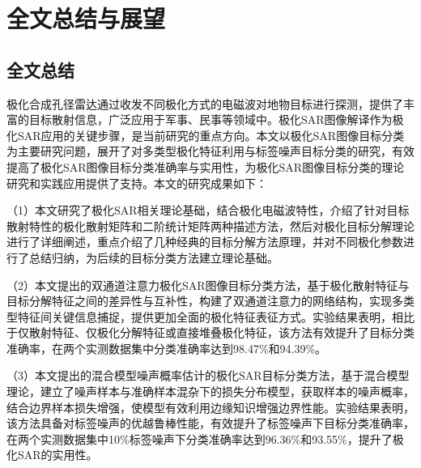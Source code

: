 \chapter{全文总结与展望}
\section{全文总结}
极化合成孔径雷达通过收发不同极化方式的电磁波对地物目标进行探测，提供了丰富的目标散射信息，广泛应用于军事、民事等领域中。极化SAR图像解译作为极化SAR应用的关键步骤，是当前研究的重点方向。本文以极化SAR图像目标分类为主要研究问题，展开了对多类型极化特征利用与标签噪声目标分类的研究，有效提高了极化SAR图像目标分类准确率与实用性，为极化SAR图像目标分类的理论研究和实践应用提供了支持。本文的研究成果如下：


（1）本文研究了极化SAR相关理论基础，结合极化电磁波特性，介绍了针对目标散射特性的极化散射矩阵和二阶统计矩阵两种描述方法，然后对极化目标分解理论进行了详细阐述，重点介绍了几种经典的目标分解方法原理，并对不同极化参数进行了总结归纳，为后续的目标分类方法建立理论基础。

（2）本文提出的双通道注意力极化SAR图像目标分类方法，基于极化散射特征与目标分解特征之间的差异性与互补性，构建了双通道注意力的网络结构，实现多类型特征间关键信息捕捉，提供更加全面的极化特征表征方式。实验结果表明，相比于仅散射特征、仅极化分解特征或直接堆叠极化特征，该方法有效提升了目标分类准确率，在两个实测数据集中分类准确率达到98.47\%和94.39\%。

（3）本文提出的混合模型噪声概率估计的极化SAR目标分类方法，基于混合模型理论，建立了噪声样本与准确样本混杂下的损失分布模型，获取样本的噪声概率，结合边界样本损失增强，使模型有效利用边缘知识增强边界性能。实验结果表明，该方法具备对标签噪声的优越鲁棒性能，有效提升了标签噪声下目标分类准确率，在两个实测数据集中10\%标签噪声下分类准确率达到96.36\%和93.55\%，提升了极化SAR的实用性。


